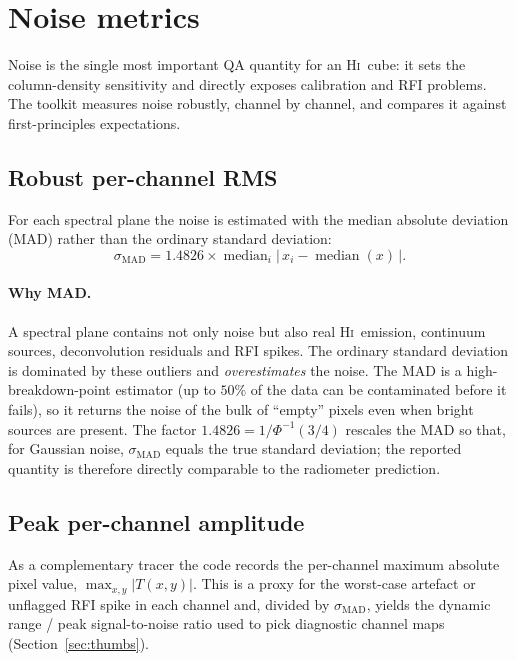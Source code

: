 \documentclass[11pt,a4paper]{article}
\begin{document}
\section{Noise metrics}\label{sec:noise}
Noise is the single most important QA quantity for an \textsc{Hi}\ cube: it sets
the column-density sensitivity and directly exposes calibration and RFI
problems. The toolkit measures noise robustly, channel by channel, and compares
it against first-principles expectations.

\subsection{Robust per-channel RMS}\label{sec:madrms}
For each spectral plane the noise is estimated with the median absolute
deviation (MAD) rather than the ordinary standard deviation:
\begin{equation}
  \sigma_{\mathrm{MAD}} = 1.4826 \times \operatorname{median}_i
  \bigl|\,x_i - \operatorname{median}(x)\,\bigr|.
  \label{eq:mad}
\end{equation}
\paragraph{Why MAD.} A spectral plane contains not only noise but also real
\textsc{Hi}\ emission, continuum sources, deconvolution residuals and RFI
spikes. The ordinary standard deviation is dominated by these outliers and
\emph{overestimates} the noise. The MAD is a high-breakdown-point estimator
(up to $50\%$ of the data can be contaminated before it fails), so it returns
the noise of the bulk of ``empty'' pixels even when bright sources are present.
The factor $1.4826 = 1/\Phi^{-1}(3/4)$ rescales the MAD so that, for Gaussian
noise, $\sigma_{\mathrm{MAD}}$ equals the true standard deviation; the reported
quantity is therefore directly comparable to the radiometer prediction.

\subsection{Peak per-channel amplitude}
As a complementary tracer the code records the per-channel maximum absolute
pixel value, $\max_{x,y}|T(x,y)|$. This is a proxy for the worst-case artefact
or unflagged RFI spike in each channel and, divided by
$\sigma_{\mathrm{MAD}}$, yields the dynamic range / peak signal-to-noise ratio
used to pick diagnostic channel maps (Section~\ref{sec:thumbs}).
\end{document}
